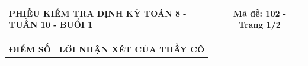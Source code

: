 \documentclass[12pt,a4paper]{article}
\begin{document}
\newpage
\noindent
\begin{tabularx}{\linewidth}{|X|c|}
\hline
\textbf{PHIẾU KIỂM TRA ĐỊNH KỲ TOÁN 8 - TUẦN 10 - BUỔI 1} & \textbf{Mã đề: 102 - Trang 1/2} \\
\hline
\end{tabularx}

\vspace{1.2mm}

\noindent
\begin{tabularx}{\linewidth}{|p{3.2cm}|X|}
\hline
\centering\textbf{ĐIỂM SỐ} & \centering\textbf{LỜI NHẬN XÉT CỦA THẦY CÔ} \tabularnewline
\hline
\rule{0pt}{1.8cm} & \tabularnewline
\hline
\end{tabularx}
\end{document}

